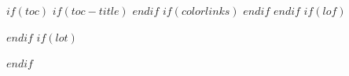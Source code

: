 $if(toc)$
$if(toc-title)$
\renewcommand*\contentsname{$toc-title$}
$endif$
{
$if(colorlinks)$
\hypersetup{linkcolor=$if(toccolor)$$toccolor$$else$ucred$endif$}
$endif$
\setcounter{tocdepth}{$toc-depth$}
\tableofcontents
}
$endif$
$if(lof)$
\listoffigures
$endif$
$if(lot)$
\listoftables
$endif$